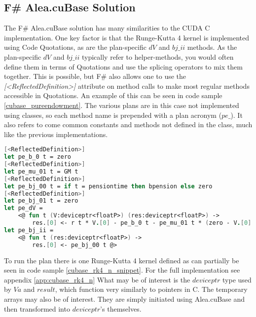 \subsection{F\# Alea.cuBase Solution}
The F\# Alea.cuBase solution has many similarities to the CUDA C implementation.
One key factor is that the Runge-Kutta 4 kernel is implemented using Code Quotations, as are the plan-specific $dV$ and $bj\_ii$ methods.
As the plan-specific $dV$ and $bj\_ii$ typically refer to helper-methods, you would often define them in terms of Quotations and use the splicing operators to mix them together.
This is possible, but F\# also allows one to use the \textit{[\textless{}ReflectedDefinition\textgreater{}]} attribute on method calls to make most regular methods accessible in Quotations.
An example of this can be seen in code sample \ref{cubase_pureendowment}. 
The various plans are in this case not implemented using classes, so each method name is prepended with a plan acronym ($pe\_$).
It also refers to come common constants and methods not defined in the class, much like the previous implementations.

\begin{lstlisting}[language=FSharp, caption=The pure endowment insurance plan expressed in F\# Alea.cuBase, label=cubase_pureendowment]
[<ReflectedDefinition>] 
let pe_b_0 t = zero
[<ReflectedDefinition>]
let pe_mu_01 t = GM t
[<ReflectedDefinition>]
let pe_bj_00 t = if t = pensiontime then bpension else zero
[<ReflectedDefinition>]
let pe_bj_01 t = zero
let pe_dV = 
	<@ fun t (V:deviceptr<floatP>) (res:deviceptr<floatP>) -> 
		res.[0] <- r t * V.[0] - pe_b_0 t - pe_mu_01 t * (zero - V.[0] + pe_bj_01 t) @>
let pe_bj_ii = 
	<@ fun t (res:deviceptr<floatP>) ->
		res.[0] <- pe_bj_00 t @>
\end{lstlisting}

To run the plan there is one Runge-Kutta 4 kernel defined as can partially be seen in code sample \ref{cubase_rk4_n_snippet}. For the full implementation see appendix \ref{app:cubase_rk4_n}
What may be of interest is the $deviceptr$ type used by $Va$ and $result$, which function very similarly to pointers in C.
The temporary arrays may also be of interest. They are simply initiated using Alea.cuBase and then transformed into $deviceptr$'s themselves.

